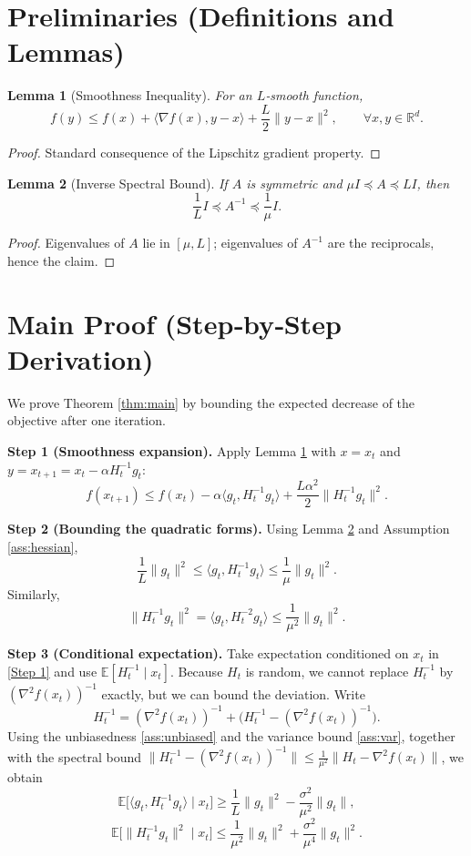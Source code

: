 \documentclass[11pt]{article}
\newtheorem{lemma}{Lemma}
\newcommand{\E}{\mathbb{E}}
\newcommand{\R}{\mathbb{R}}
\begin{document}
\newpage
\section*{Preliminaries (Definitions and Lemmas)}
\begin{lemma}[Smoothness Inequality]\label{lem:smooth}
For an $L$‑smooth function,
\[
f(y)\le f(x)+\langle\nabla f(x),y-x\rangle+\frac{L}{2}\|y-x\|^{2},
\qquad\forall x,y\in\R^{d}.
\]
\end{lemma}
\begin{proof}
Standard consequence of the Lipschitz gradient property. \qedhere
\end{proof}

\begin{lemma}[Inverse Spectral Bound]\label{lem:inv}
If $A$ is symmetric and $\mu I\preceq A\preceq L I$, then
\[
\frac{1}{L} I\preceq A^{-1}\preceq \frac{1}{\mu} I.
\]
\end{lemma}
\begin{proof}
Eigenvalues of $A$ lie in $[\mu,L]$; eigenvalues of $A^{-1}$ are the reciprocals,
hence the claim. \qedhere
\end{proof}

\section*{Main Proof (Step‑by‑Step Derivation)}
We prove Theorem \ref{thm:main} by bounding the expected decrease of the
objective after one iteration.

\medskip
\noindent\textbf{Step 1 (Smoothness expansion).}  
Apply Lemma \ref{lem:smooth} with $x=x_{t}$ and $y=x_{t+1}=x_{t}-\alpha H_{t}^{-1}g_{t}$:
\[
f(x_{t+1})\le f(x_{t})-\alpha\langle g_{t},H_{t}^{-1}g_{t}\rangle
+\frac{L\alpha^{2}}{2}\|H_{t}^{-1}g_{t}\|^{2}. \tag{Step 1}
\]

\noindent\textbf{Step 2 (Bounding the quadratic forms).}  
Using Lemma \ref{lem:inv} and Assumption \ref{ass:hessian},
\[
\frac{1}{L}\|g_{t}\|^{2}\le \langle g_{t},H_{t}^{-1}g_{t}\rangle
\le \frac{1}{\mu}\|g_{t}\|^{2}. \tag{Step 2a}
\]
Similarly,
\[
\|H_{t}^{-1}g_{t}\|^{2}
= \langle g_{t},H_{t}^{-2}g_{t}\rangle
\le \frac{1}{\mu^{2}}\|g_{t}\|^{2}. \tag{Step 2b}
\]

\noindent\textbf{Step 3 (Conditional expectation).}  
Take expectation conditioned on $x_{t}$ in \eqref{Step 1} and use
$\E[H_{t}^{-1}\mid x_{t}]$.
Because $H_{t}$ is random, we cannot replace $H_{t}^{-1}$ by
$(\nabla^{2}f(x_{t}))^{-1}$ exactly, but we can bound the deviation.
Write
\[
H_{t}^{-1}= (\nabla^{2}f(x_{t}))^{-1}
+ \big(H_{t}^{-1}-(\nabla^{2}f(x_{t}))^{-1}\big).
\]
Using the unbiasedness \eqref{ass:unbiased} and the variance bound
\eqref{ass:var}, together with the spectral bound
$\|H_{t}^{-1}-(\nabla^{2}f(x_{t}))^{-1}\|\le
\frac{1}{\mu^{2}}\|H_{t}-\nabla^{2}f(x_{t})\|$, we obtain
\[
\E\!\big[\langle g_{t},H_{t}^{-1}g_{t}\rangle\mid x_{t}\big]
\ge \frac{1}{L}\|g_{t}\|^{2}
-\frac{\sigma^{2}}{\mu^{2}}\|g_{t}\|, \tag{Step 3a}
\]
\[
\E\!\big[\|H_{t}^{-1}g_{t}\|^{2}\mid x_{t}\big]
\le \frac{1}{\mu^{2}}\|g_{t}\|^{2}+\frac{\sigma^{2}}{\mu^{4}}\|g_{t}\|^{2}. \tag{Step 3b}
\]
\end{document}
